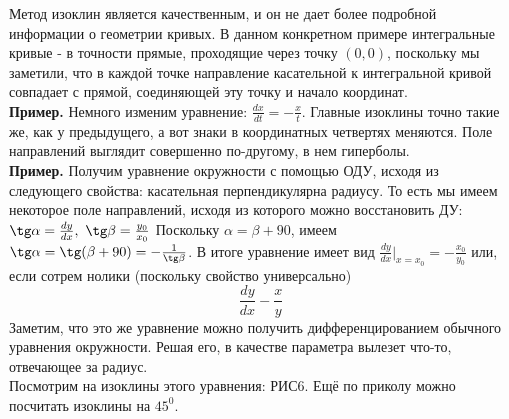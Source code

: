 Метод изоклин является качественным, и он не дает более подробной информации
о геометрии кривых. В данном конкретном примере интегральные кривые - в 
точности прямые, проходящие через точку $(0,0)$, поскольку мы заметили, что в 
каждой точке направление касательной к интегральной кривой совпадает с прямой, 
соединяющей эту точку и начало координат.\\
\textbf{Пример.} Немного изменим уравнение: $\frac{dx}{dt}=-\frac{x}{t}$. 
Главные изоклины точно такие же, как у предыдущего, а вот знаки в координатных
четвертях меняются. Поле направлений выглядит совершенно по-другому, в нем 
гиперболы. \\
\textbf{Пример.} Получим уравнение окружности с помощью ОДУ, исходя из 
следующего свойства: касательная перпендикулярна радиусу. То есть мы имеем 
некоторое поле направлений, исходя из которого можно восстановить ДУ:
$\tg\alpha=\frac{dy}{dx},~\tg\beta=\frac{y_0}{x_0}$ 
Поскольку $\alpha=\beta+90$, имеем
$\tg\alpha=\tg(\beta+90)=-\frac{1}{\tg\beta}$. В итоге уравнение имеет вид
$\frac{dy}{dx}\big|_{x=x_0}=-\frac{x_0}{y_0}$
или, если сотрем нолики (поскольку свойство универсально)
$$\frac{dy}{dx}-\frac{x}{y}$$
Заметим, что это же уравнение можно получить дифференцированием обычного
уравнения окружности. Решая его, в качестве параметра вылезет что-то, 
отвечающее за радиус. \\
Посмотрим на изоклины этого уравнения: РИС6. Ещё по приколу можно посчитать 
изоклины на $45^0$.










